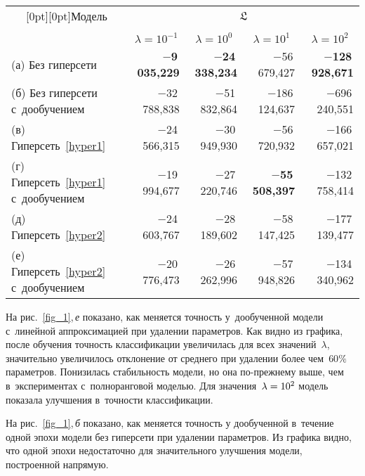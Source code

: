 \begin{multicols}{2}
\begin{table*}
\begin{center}
\begin{tabular}{|l|r|r|r|r|} %
\hline
\multicolumn{1}{|c|}{\raisebox{-6pt}[0pt][0pt]{Модель} } & \multicolumn{4}{c|}{$\mathfrak{L}$}\\
\cline{2-5}
&&&&\\[-9pt]
& \multicolumn{1}{c|}{$\lambda = 10^{-1}$} & 
 \multicolumn{1}{c|}{$\lambda = 10^0$} & 
\multicolumn{1}{c|}{$\lambda = 10^1$} & 
\multicolumn{1}{c|}{$\lambda = 10^2$}\\ 
\hline
 (а) Без гиперсети                          & \bf{$-$9\,035,229} 
& \bf{$-$24\,338,234}  & $-$56\,679,427  & \bf{$-$128\,928,671}      \\ 
 (б) Без гиперсети с~дообучением            & $-$32\,788,838   & $-$51\,832,864   & $-$186\,124,637& $-$696\,240,551  \\ 
 (в) Гиперсеть~\eqref{hyper1}               & $-$24\,566,315 & $-$30\,949,930 & $-$56\,720,932   & $-$166\,657,021   \\ 
 (г) Гиперсеть~\eqref{hyper1} с~дообучением & $-$19\,994,677  & $-$27\,220,746 & \bf{$-$55\,508,397}   & $-$132\,758,414   \\ 
 (д) Гиперсеть~\eqref{hyper2}   & $-$24\,603,767  & $-$28\,189,602    & $-$58\,147,425 & $-$177\,139,477\\ 
 (е) Гиперсеть~\eqref{hyper2} с~дообучением & $-$20\,776,473  & $-$26\,262,996  & $-$57\,948,826  & $-$134\,340,962 \\
 \hline
\end{tabular}
\end{center}
\vspace*{-3pt}
\end{table*}

На рис.~\ref{fig_1},\,\textit{е} показано, как меняется точность у~дообученной модели 
с~линейной аппроксимацией при удалении параметров. Как видно из графика, после 
обучения точность классификации увеличилась для всех значений~$\lambda$, 
значительно увеличилось отклонение от среднего при удалении более чем~$60\%$ 
параметров. Понизилась стабильность модели, но она по-прежнему выше, чем 
в~экспериментах с~полноранговой моделью. Для значения~$\lambda \hm= 10^2$ модель 
показала улучшения в~точности классификации.

На рис.~\ref{fig_1},\,\textit{б} показано, как меняется точность у дообученной в~течение 
одной эпохи модели без гиперсети при удалении параметров. Из графика видно, что 
одной эпохи недостаточно для значительного улучшения модели, построенной 
напрямую.


\end{multicols}
